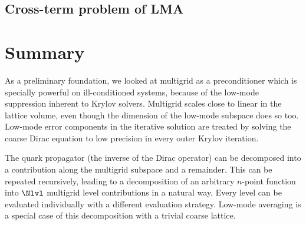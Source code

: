 
\subsection{Cross-term problem of LMA}



\section{Summary}
\label{sec:mg:summary}

As a preliminary foundation, we looked at multigrid as a preconditioner which is specially powerful on ill-conditioned systems, because of the low-mode suppression inherent to Krylov solvers.
Multigrid scales close to linear in the lattice volume, even though the dimension of the low-mode subspace does so too.
Low-mode error components in the iterative solution are treated by solving the coarse Dirac equation to low precision in every outer Krylov iteration.

The quark propagator (the inverse of the Dirac operator) can be decomposed into a contribution along the multigrid subspace and a remainder.
This can be repeated recursively, leading to a decomposition of an arbitrary $n$-point function into $\Nlvl$ multigrid level contributions in a natural way.
Every level can be evaluated individually with a different evaluation strategy.
Low-mode averaging is a special case of this decomposition with a trivial coarse lattice.


